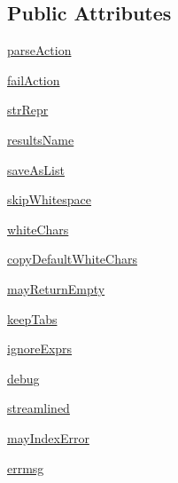 \subsection*{Public Attributes}
\begin{DoxyCompactItemize}
\item 
\hyperlink{classpip_1_1__vendor_1_1pyparsing_1_1ParserElement_a6b4bc25ee746e5f1070dae4bba719a41}{parse\+Action}
\item 
\hyperlink{classpip_1_1__vendor_1_1pyparsing_1_1ParserElement_a0d7f3f474c81940727dafaf9e15d7b3f}{fail\+Action}
\item 
\hyperlink{classpip_1_1__vendor_1_1pyparsing_1_1ParserElement_a22a44c2736cd9edc0ee5d79bb42ed076}{str\+Repr}
\item 
\hyperlink{classpip_1_1__vendor_1_1pyparsing_1_1ParserElement_a706315de3c4a42fbbb76782296d25e17}{results\+Name}
\item 
\hyperlink{classpip_1_1__vendor_1_1pyparsing_1_1ParserElement_a59352f200ba9120c9aeb07bfdfa43cda}{save\+As\+List}
\item 
\hyperlink{classpip_1_1__vendor_1_1pyparsing_1_1ParserElement_a08d893c49026ab2c54d0022886c6842f}{skip\+Whitespace}
\item 
\hyperlink{classpip_1_1__vendor_1_1pyparsing_1_1ParserElement_abf8bd0cea2cc671aea186f2cd6860bc5}{white\+Chars}
\item 
\hyperlink{classpip_1_1__vendor_1_1pyparsing_1_1ParserElement_acbcdbbb20cd2ccbf3e8b4cc5fa84893b}{copy\+Default\+White\+Chars}
\item 
\hyperlink{classpip_1_1__vendor_1_1pyparsing_1_1ParserElement_a4314a4baeee8deceb58513edadceef4d}{may\+Return\+Empty}
\item 
\hyperlink{classpip_1_1__vendor_1_1pyparsing_1_1ParserElement_a98a466764cbd1715eec4eb3415cf406c}{keep\+Tabs}
\item 
\hyperlink{classpip_1_1__vendor_1_1pyparsing_1_1ParserElement_a04c6563b26466dd6147a49e5797ff8a0}{ignore\+Exprs}
\item 
\hyperlink{classpip_1_1__vendor_1_1pyparsing_1_1ParserElement_a90177a4f782afc6d4e2a9a4ef7cfadb1}{debug}
\item 
\hyperlink{classpip_1_1__vendor_1_1pyparsing_1_1ParserElement_a2c8633fb14dd8198d5e6992171a26561}{streamlined}
\item 
\hyperlink{classpip_1_1__vendor_1_1pyparsing_1_1ParserElement_ab5c55aae52f987fd1b3f00302da987c8}{may\+Index\+Error}
\item 
\hyperlink{classpip_1_1__vendor_1_1pyparsing_1_1ParserElement_a8bfcd4e325b0150256383aa715765eae}{errmsg}

\end{DoxyCompactItemize}
